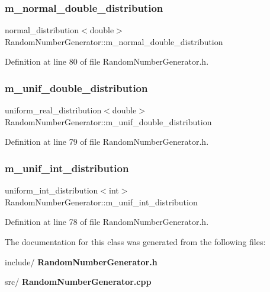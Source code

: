 \mbox{\label{class_random_number_generator_af52b8c4de45f210754524225e97279b1}} 
\subsubsection{m\_normal\_double\_distribution}
{\footnotesize\ttfamily normal\+\_\+distribution$<$double$>$ Random\+Number\+Generator\+::m\+\_\+normal\+\_\+double\+\_\+distribution\hspace{0.3cm}{\ttfamily [private]}}



Definition at line 80 of file Random\+Number\+Generator.\+h.

\mbox{\label{class_random_number_generator_ab7697a4a0f3efe902aa49828bd78f1e2}} 
\subsubsection{m\_unif\_double\_distribution}
{\footnotesize\ttfamily uniform\+\_\+real\+\_\+distribution$<$double$>$ Random\+Number\+Generator\+::m\+\_\+unif\+\_\+double\+\_\+distribution\hspace{0.3cm}{\ttfamily [private]}}



Definition at line 79 of file Random\+Number\+Generator.\+h.

\mbox{\label{class_random_number_generator_a7a3a5b9bfbb1306f364704bc3a9860b6}} 
\subsubsection{m\_unif\_int\_distribution}
{\footnotesize\ttfamily uniform\+\_\+int\+\_\+distribution$<$int$>$ Random\+Number\+Generator\+::m\+\_\+unif\+\_\+int\+\_\+distribution\hspace{0.3cm}{\ttfamily [private]}}



Definition at line 78 of file Random\+Number\+Generator.\+h.



The documentation for this class was generated from the following files\+:\begin{DoxyCompactItemize}
\item 
include/\textbf{ Random\+Number\+Generator.\+h}\item 
src/\textbf{ Random\+Number\+Generator.\+cpp}\end{DoxyCompactItemize}
